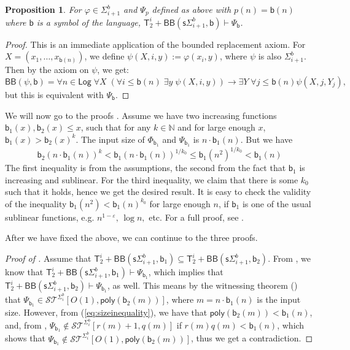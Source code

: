 \documentclass[11pt]{article}
\newcommand{\poly}{\mathsf{poly}}
\newcommand{\N}{\mathbb{N}}
\newcommand{\bd}{\mathsf{b}}
\newtheorem{proposition}[theorem]{Proposition}
\theoremstyle{definition}
\theoremstyle{definition}
\theoremstyle{remark}
\begin{document}
\begin{proposition}\label{prop:psi}
    For $\varphi\in \Sigma^b_{i+1}$  and $\Psi_{p}$ defined as above with $p(n)=\bd(n)$ where $\bd$ is a symbol of the language, $\mathsf{T}^i_2+\mathsf{BB}(\mathsf{s}\Sigma^b_{i+1},\bd)\vdash \Psi_{\bd}$.
\end{proposition}

\begin{proof}
    This is an immediate application of the bounded replacement axiom. For $X=(x_1,\dots,x_{\bd(n)})$, we define $\psi(X,i,y):=\varphi(x_i,y)$, where $\psi$ is also $\Sigma^b_{i+1}$. Then by the axiom on $\psi$, we get:
    $$
    \mathsf{BB}(\psi,\bd) = \forall n\in \mathsf{Log}\; \forall X\; (\forall i\leq \bd(n)\;\exists y\;\psi(X,i,y))\rightarrow \exists Y\;\forall j\leq \bd(n) \psi(X,j,Y_j),
    $$
    but this is equivalent with $\Psi_{\bd}$.
\end{proof}

We will now go to the proofs . Assume we have two increasing functions $\bd_1(x), \bd_2(x) \leq x$, such that for any $k\in\N$ and for large enough $x$, $\bd_1(x)> \bd_2(x)^k$. The input size of $\Phi_{\bd_1}$ and $\Psi_{\bd_1}$ is $n\cdot \bd_1(n)$. But we have
\begin{equation}\label{eq:sizeinequality}
\bd_2(n\cdot\bd_1(n))^k<\bd_1(n\cdot\bd_1(n))^{1/k_0}\leq \bd_1(n^2)^{1/k_0} < \bd_1(n)
\end{equation}
The first inequality is from the assumptions, the second from the fact that $\bd_1$ is increasing and sublinear. For the third inequality, we claim that there is some $k_0$ such that it holds, hence we get the desired result. It is easy to check the validity of the inequality $\bd_1(n^2)< \bd_1(n)^{k_0}$ for large enough $n$, if $\bd_1$ is one of the usual sublinear functions, e.g. $n^{1-\varepsilon},\,\log n,$ etc. For a full proof, see .

After we have fixed the above, we can continue to the three proofs.

\begin{proof} [Proof of ] Assume that $\mathsf{T}^i_2+\mathsf{BB}(\mathsf{s}\Sigma^b_{i+1},\bd_1)\subseteq \mathsf{T}^i_2+\mathsf{BB}(\mathsf{s}\Sigma^b_{i+1},\bd_2)$. From , we know that $\mathsf{T}^i_2+\mathsf{BB}(\mathsf{s}\Sigma^b_{i+1},\bd_1)\vdash \Psi_{\bd_1}$, which implies that $\mathsf{T}^i_2+\mathsf{BB}(\mathsf{s}\Sigma^b_{i+1},\bd_2)\vdash \Psi_{\bd_1}$, as well. This means by the witnessing theorem () that $\Psi_{\bd_1}\in \mathcal{ST}^{\Sigma^b_i}[O(1), \poly (\bd_2(m))]$, where $m=n\cdot \bd_1(n)$ is the input size. However, from (\ref{eq:sizeinequality}), we have that $\poly(\bd_2(m))< \bd_1(n)$, and, from , $\Psi_{\bd_1}\not\in \mathcal{ST}^{\Sigma^b_i}[r(m)+1,q(m)]$ if $r(m)q(m)<\bd_1(n)$, which shows that $\Psi_{\bd_1}\not\in \mathcal{ST}^{\Sigma^b_i}[O(1),\poly(\bd_2(m))]$, thus we get a contradiction.
\end{proof}
\end{document}
